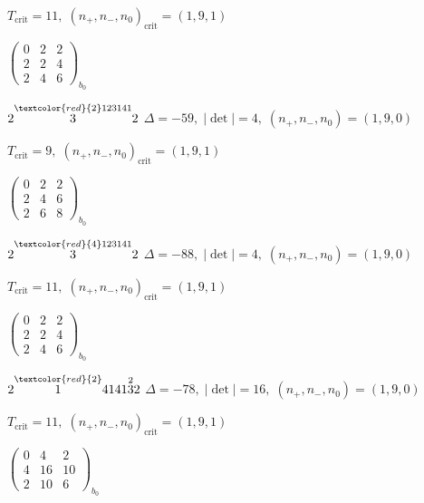 \documentclass[10pt]{article}
\begin{document}
\hspace{1em}$T_{\text{crit}}=11,\; (n_+,n_-,n_0)_{\text{crit}}=(1,9,1)$

\hspace{2em}$\left(\begin{smallmatrix}0 & 2 & 2 \\ 2 & 2 & 4 \\ 2 & 4 & 6\end{smallmatrix}\right)_{\!b_0}$

$2\overset{\textcolor{red}{2}123141}{3}2$ \quad $\Delta=-59,\; |\det|=4,\; (n_+,n_-,n_0)=(1,9,0)$

\hspace{1em}$T_{\text{crit}}=9,\; (n_+,n_-,n_0)_{\text{crit}}=(1,9,1)$

\hspace{2em}$\left(\begin{smallmatrix}0 & 2 & 2 \\ 2 & 4 & 6 \\ 2 & 6 & 8\end{smallmatrix}\right)_{\!b_0}$

$2\overset{\textcolor{red}{4}123141}{3}2$ \quad $\Delta=-88,\; |\det|=4,\; (n_+,n_-,n_0)=(1,9,0)$

\hspace{1em}$T_{\text{crit}}=11,\; (n_+,n_-,n_0)_{\text{crit}}=(1,9,1)$

\hspace{2em}$\left(\begin{smallmatrix}0 & 2 & 2 \\ 2 & 2 & 4 \\ 2 & 4 & 6\end{smallmatrix}\right)_{\!b_0}$

\smallskip

$2\overset{\textcolor{red}{2}}{1}4141\overset{2}{3}2$ \quad $\Delta=-78,\; |\det|=16,\; (n_+,n_-,n_0)=(1,9,0)$

\hspace{1em}$T_{\text{crit}}=11,\; (n_+,n_-,n_0)_{\text{crit}}=(1,9,1)$

\hspace{2em}$\left(\begin{smallmatrix}0 & 4 & 2 \\ 4 & 16 & 10 \\ 2 & 10 & 6\end{smallmatrix}\right)_{\!b_0}$

\smallskip
\end{document}
